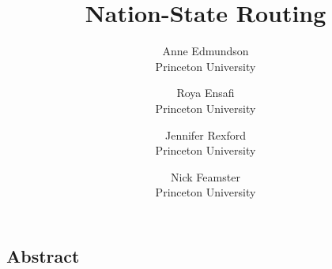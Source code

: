 \documentclass[letterpaper,twocolumn,10pt]{article}
\begin{document}
\date{}

\title{\Large \bf Nation-State Routing}

\author{
{\rm Anne Edmundson}\\
Princeton University
\and
{\rm Roya Ensafi}\\
Princeton University
\and
{\rm Jennifer Rexford}\\
Princeton University
\and
{\rm Nick Feamster}\\
Princeton University
} %

\maketitle

\thispagestyle{empty}

\subsection*{Abstract}









{\footnotesize 
}

\end{document}
